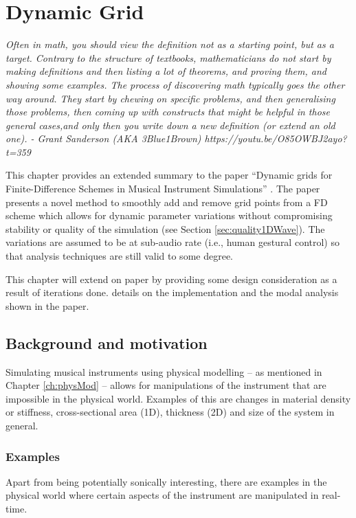 \chapter{Dynamic Grid}\label{ch:dynamicGrid}

\textit{Often in math, you should view the definition not as a starting point, but as a target. Contrary to the structure of textbooks, mathematicians do not start by making definitions and then listing a lot of theorems, and proving them, and showing some examples. The process of discovering math typically goes the other way around. They start by chewing on specific problems, and then generalising those problems, then coming up with constructs that might be helpful in those general cases,and only then you write down a new definition (or extend an old one). - Grant Sanderson (AKA 3Blue1Brown) https://youtu.be/O85OWBJ2ayo?t=359}

This chapter provides an extended summary to the paper ``Dynamic grids for Finite-Difference Schemes in Musical Instrument Simulations'' \citeP[G]. The paper presents a novel method to smoothly add and remove grid points from a FD scheme which allows for dynamic parameter variations without compromising stability or quality of the simulation (see Section \ref{sec:quality1DWave}). The variations are assumed to be at sub-audio rate (i.e., human gestural control) so that analysis techniques are still valid to some degree.

This chapter will extend on paper \citeP[G] by providing some design consideration as a result of iterations done.  details on the implementation and the modal analysis shown in the paper. 

\section{Background and motivation}
Simulating musical instruments using physical modelling -- as mentioned in Chapter \ref{ch:physMod} -- allows for manipulations of the instrument that are impossible in the physical world. Examples of this are changes in material density or stiffness, cross-sectional area (1D), thickness (2D) and size of the system in general. 



\subsection{Examples}
Apart from being potentially sonically interesting, there are examples in the physical world where certain aspects of the instrument are manipulated in real-time.

